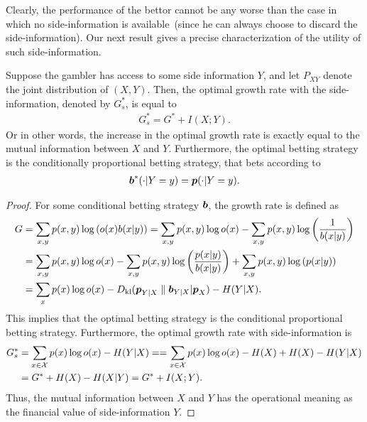    Clearly, the performance of the bettor cannot be any worse than the case in which no side-information is available~(since he can always choose to discard the side-information). Our next result gives a precise characterization of the utility of such side-information. 
    \begin{proposition}
        \label{prop:horse-race-side-info} 
        Suppose the gambler has access to some side information $Y$, and let $P_{XY}$ denote the joint distribution of $(X,Y)$. Then, the optimal growth rate with the side-information, denoted by $G^*_s$, is equal to
        \begin{align}
            G^*_s = G^* + I(X;Y). 
        \end{align}
        Or in other words, the increase in the optimal growth rate is exactly equal to the mutual information between $X$ and $Y$. Furthermore, the optimal betting strategy is the conditionally proportional betting strategy, that bets according to 
        \begin{align}
            \boldsymbol{b}^*(\cdot | Y=y) = \boldsymbol{p}(\cdot |Y=y). 
        \end{align}
    \end{proposition}
    \begin{proof}
        For some conditional betting strategy $\boldsymbol{b}$, the growth rate is defined as 
        \begin{align}
            G &= \sum_{x, y} p(x,y) \log \left( o(x) b(x|y) \right) = \sum_{x, y} p(x,y) \log o(x) - \sum_{x, y} p(x,y) \log \left( \frac{1}{b(x|y)}  \right) \\
            & = \sum_{x, y} p(x,y) \log o(x) - \sum_{x, y} p(x,y) \log \left( \frac{p(x|y)}{b(x|y)} \right) +\sum_{x, y} p(x,y) \log \left( p(x|y) \right) \\
            & = \sum_{x }p(x) \log o(x) - D_{\text{kl}}( \boldsymbol{p}_{Y|X} \parallel \boldsymbol{b}_{Y|X} | \boldsymbol{p}_X) - H(Y|X). 
        \end{align}
        This implies that the optimal betting strategy is the conditional proportional betting strategy. Furthermore, the optimal growth rate with side-information is 
        \begin{align}
            G^*_s &= \sum_{x \in \mathcal{X}}p(x) \log o(x) - H(Y|X) = = \sum_{x \in \mathcal{X}}p(x) \log o(x) - H(X) + H(X)- H(Y|X) \\
            & = G^* + H(X) - H(X|Y) = G^* + I(X;Y).
        \end{align}
        Thus, the mutual information between $X$ and $Y$ has the operational meaning as the financial value of side-information $Y$. 
    \end{proof}


